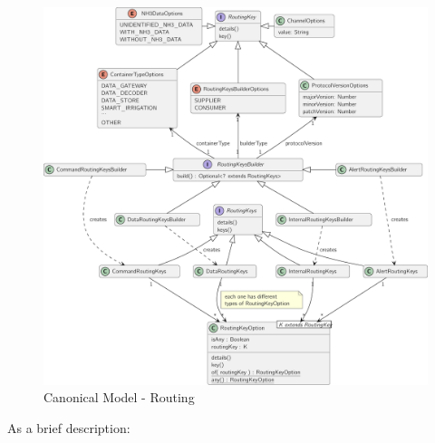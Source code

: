\begin{figure}[H]
   \centering
  \includegraphics[page=1,width=\columnwidth]{assets/diagrams/design/domain/routing-model.pdf}
  \caption[Canonical Model - Routing]{Canonical Model - Routing}
  \label{fig:design:domain:shared_model:routing:diagram}
\end{figure}

As a brief description:

